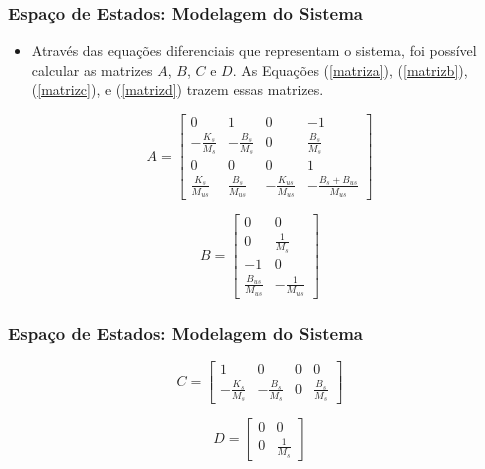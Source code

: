 \documentclass{beamer}
\begin{document}
\begin{frame}
\frametitle{Espaço de Estados: Modelagem do Sistema}
\begin{itemize}
\item Através das equações diferenciais que representam o sistema, foi possível calcular as matrizes $A$, $B$, $C$ e $D$. As Equações (\ref{matriza}), (\ref{matrizb}), (\ref{matrizc}), e (\ref{matrizd}) trazem essas matrizes.
\end{itemize}
\begin{equation}\label{matriza}
A=\left[\begin{matrix}
0 & 1 & 0 & -1 \\
-\frac{K_s}{M_s} & -\frac{B_s}{M_s} & 0 & \frac{B_s}{M_s} \\
0 & 0 & 0 & 1 \\
\frac{K_s}{M_{us}} & \frac{B_s}{M_{us}} & -\frac{K_{us}}{M_{us}} & -\frac{B_s+B_{us}}{M_{us}}
\end{matrix} \right]
\end{equation}

\begin{equation}\label{matrizb}
B=\left[\begin{matrix}
0 & 0 \\
0 & \frac{1}{M_s} \\
-1 & 0 \\
\frac{B_{us}}{M_{us}} & -\frac{1}{M_{us}}
\end{matrix}\right]
\end{equation}
\end{frame}

\begin{frame}
\frametitle{Espaço de Estados: Modelagem do Sistema}
\begin{equation}\label{matrizc}
C=\left[\begin{matrix}
1 & 0 & 0 & 0 \\
-\frac{K_s}{M_s} & -\frac{B_s}{M_s} & 0 & \frac{B_s}{M_s}
\end{matrix}\right]
\end{equation}

\begin{equation}\label{matrizd}
D=\left[ \begin{matrix}
0 & 0 \\
0 & \frac{1}{M_s}
\end{matrix} \right]
\end{equation}
\end{frame}
\end{document}
